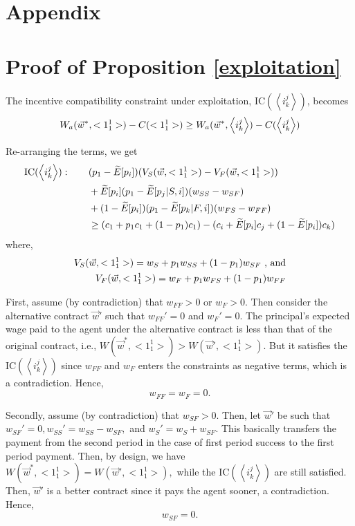 \documentclass[11pt]{article} %
\theoremstyle{exampstyle}
\newcommand{\be}{\begin{equation}}
\newcommand{\ee}{\end{equation}}
\newcommand{\eq}[1]{\begin{align}#1\end{align}}
\newcommand{\la}{ \left < }
\newcommand{\ra}{ \right > }
\begin{document}

\newpage
\appendix
\singlespace
\setlength{\parindent}{0pt}


\section*{Appendix}

\section{Proof of Proposition \ref{exploitation}}
The incentive compatibility constraint under exploitation, IC$(\la i^j_k \ra)$, becomes
\be
 W_a(\vec{w}^*, <1^1_1>)  - C(<1^1_1>) \ge W_a(\vec{w}^*, \la i^j_k \ra)  - C(\la i^j_k \ra)  	\notag
\ee

Re-arranging the terms, we get
\eq{
\text{IC$(\la i^j_k \ra):$} \hspace{.3in} &(p_1- \widetilde{E}[p_i])(V_S(\vec{w},<1^1_1>)-V_F(\vec{w},<1^1_1>))  \notag \\
&+  \widetilde{E}[p_i] (p_1- \widetilde{E}[p_j | S,i]) (w_{SS}-w_{SF} ) \notag \\
&+ (1- \widetilde{E}[p_i]) (p_1- \widetilde{E}[p_k | F,i]) (w_{FS}-w_{FF} )  \notag \\
& \ge (c_1+p_1c_1+(1-p_1)c_1) - (c_i + \widetilde{E}[p_i]c_j + (1-\widetilde{E}[p_i])c_k)  \notag
}
where,
\eq{
V_S(\vec{w},<1^1_1>)= w_S + p_1 w_{SS} + (1-p_1) w_{SF} \text{  , and} \notag \\
V_F(\vec{w},<1^1_1>)= w_F + p_1 w_{FS} + (1-p_1) w_{FF}  \notag
}

First, assume (by contradiction) that $w_{FF} > 0$ or $w_F > 0.$ Then consider the alternative contract $\vec{w}'$ such that $w_{FF}'=0$ and $w_{F}'=0$. The principal's expected wage paid to the agent under the alternative contract is less than that of the original contract, i.e.,   $W(\vec{w}^*, <1^1_1>) >  W(\vec{w}', <1^1_1>).$ But it satisfies the IC$(\la i^j_k \ra)$ since $w_{FF}$ and $w_{F}$ enters the constraints as negative terms, which is a contradiction. Hence,
\[ w_{FF}=w_F=0. \]

Secondly, assume (by contradiction) that $w_{SF} >0$.  Then, let $\vec{w}'$ be such that $w_{SF}'=0, w_{SS}'=w_{SS}-w_{SF},$ and $w_S'=w_S+w_{SF}.$ This basically transfers the payment from the second period in the case of first period success to the first period payment. Then, by design, we have  $W(\vec{w}^*, <1^1_1>) =  W(\vec{w}', <1^1_1>),$ while the  IC$(\la i^j_k \ra)$  are still satisfied. Then,  $\vec{w}'$ is a better contract  since it pays the agent sooner, a contradiction. Hence,
\[w_{SF}=0.\]
\end{document}
